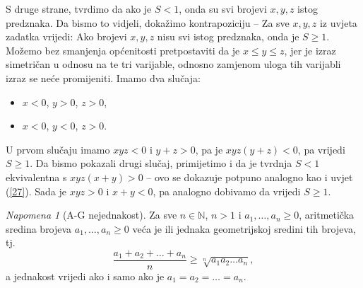 \documentclass{book}
\renewenvironment{proof}{%
    \vspace{-\parskip}\begin{oldproof}%
    }{%
    \end{oldproof}%
}
\theoremstyle{definition}
\theoremstyle{definition}
\theoremstyle{remark}
\newtheorem{remark}{Napomena}
\begin{document}
\begin{proof}[Rješenje]
S druge strane, tvrdimo da ako je $S<1$, onda su svi brojevi $x, y, z$ istog predznaka. Da bismo to vidjeli, dokažimo kontrapoziciju -- Za sve $x, y, z$ iz uvjeta zadatka vrijedi: Ako brojevi $x, y, z$ nisu svi istog predznaka, onda je $S\geq 1$. Možemo bez smanjenja općenitosti pretpostaviti da je $x\leq y\leq z$, jer je izraz simetričan u odnosu na te tri varijable, odnosno zamjenom uloga tih varijabli izraz se neće promijeniti. Imamo dva slučaja:
\begin{itemize}
\item $x<0$, $y>0$, $z>0$,
\item $x<0$, $y<0$, $z>0$.
\end{itemize}
U prvom slučaju imamo $xyz<0$ i $y+z>0$, pa je $xyz(y+z)<0$, pa vrijedi $S\geq 1$. Da bismo pokazali drugi slučaj, primijetimo i da je tvrdnja $S<1$ ekvivalentna s $xyz(x+y)>0$ -- ovo se dokazuje potpuno analogno kao i uvjet (\ref{27}). Sada je $xyz>0$ i $x+y<0$, pa analogno dobivamo da vrijedi $S\geq 1$.
\end{proof}
\begin{remark}[A-G nejednakost]
\label{agrem}
Za sve $n\in \mathbb{N}$, $n>1$ i $a_1, \dots, a_n\geq 0$, aritmetička sredina brojeva $a_1, \dots, a_n\geq 0$ veća je ili jednaka geometrijskoj sredini tih brojeva, tj.
$$\dfrac{a_1+a_2+\dots+a_n}{n}\geq \sqrt[n]{a_1a_2\dots a_n},$$
a jednakost vrijedi ako i samo ako je $a_1=a_2=\dots=a_n$.
\end{remark}
\end{document}

